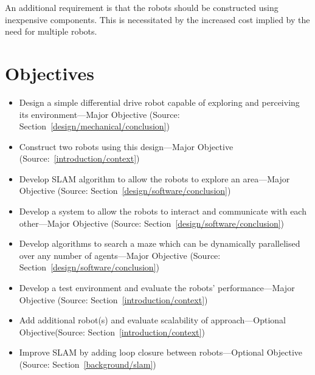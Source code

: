 An additional requirement is that the robots should be constructed using
inexpensive components. This is necessitated by the increased cost implied by the
need for multiple robots.

\section{Objectives}\label{introduction/objectives}
\begin{itemize}
\item{Design a simple differential drive robot capable of exploring and perceiving its environment---Major Objective (Source: Section~\ref{design/mechanical/conclusion})}
    \item{Construct two robots using this design---Major Objective (Source:~\ref{introduction/context})}
    \item{Develop SLAM algorithm to allow the robots to explore an area---Major Objective (Source: Section~\ref{design/software/conclusion})}
    \item{Develop a system to allow the robots to interact and communicate with each other---Major Objective (Source: Section~\ref{design/software/conclusion})}
    \item{Develop algorithms to search a maze which can be dynamically parallelised over any number of agents---Major Objective (Source: Section~\ref{design/software/conclusion})}
    \item{Develop a test environment and evaluate the robots’ performance---Major Objective (Source: Section~\ref{introduction/context})}
    \item{Add additional robot(s) and evaluate scalability of approach---Optional Objective(Source: Section~\ref{introduction/context})}
    \item{Improve SLAM by adding loop closure between robots---Optional Objective (Source: Section~\ref{background/slam})}
\end{itemize}